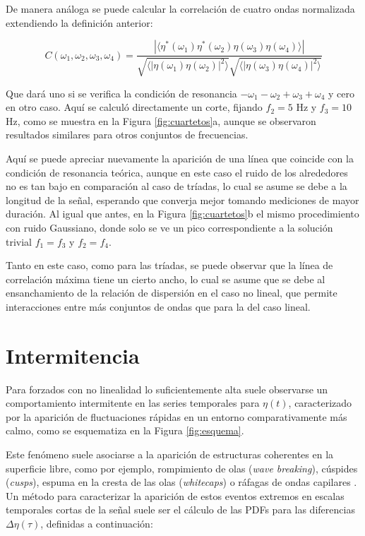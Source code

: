De manera análoga se puede calcular la correlación de cuatro ondas normalizada extendiendo la definición anterior: 

\begin{equation}
	C(\omega_1, \omega_2, \omega_3, \omega_4) = \frac{|\langle\eta^*(\omega_1)\eta^*(\omega_2)\eta(\omega_3)\eta(\omega_4)  \rangle|}{\sqrt{\langle|\eta(\omega_1)\eta(\omega_2)|^2\rangle}\sqrt{\langle|\eta(\omega_3)\eta(\omega_4)|^2\rangle}} %
\end{equation}

Que dará uno si se verifica la condición de resonancia $-\omega_1-\omega_2+\omega_3+\omega_4$ y cero en otro caso. Aquí se calculó directamente un corte, fijando $f_2=5$ Hz y $f_3=10$ Hz, como se muestra en la Figura \ref{fig:cuartetos}a, aunque se observaron resultados similares para otros conjuntos de frecuencias. %



Aquí se puede apreciar nuevamente la aparición de una línea que coincide con la condición de resonancia teórica, aunque en este caso el ruido de los alrededores no es tan bajo en comparación al caso de tríadas, lo cual se asume se debe a la longitud de la señal, esperando que converja mejor tomando mediciones de mayor duración. Al igual que antes, en la Figura \ref{fig:cuartetos}b el mismo procedimiento con ruido Gaussiano, donde solo se ve un pico correspondiente a la solución trivial $f_1=f_3$ y $f_2=f_4$. 

Tanto en este caso, como para las tríadas, se puede observar que la línea de correlación máxima tiene un cierto ancho, lo cual se asume que se debe al ensanchamiento de la relación de dispersión en el caso no lineal, que permite interacciones entre más conjuntos de ondas que para la del caso lineal. 



\section{Intermitencia} 
\label{sec:intermitencia}  %
Para forzados con no linealidad lo suficientemente alta suele observarse un comportamiento intermitente en las series temporales para $\eta(t)$, caracterizado por la aparición de fluctuaciones rápidas en un entorno comparativamente más calmo, como se esquematiza en la Figura \ref{fig:esquema}.  


Este fenómeno suele asociarse a la aparición de estructuras coherentes en la superficie libre, como por ejemplo, rompimiento de olas (\textit{wave breaking}), cúspides (\textit{cusps}), espuma en la cresta de las olas (\textit{whitecaps}) o ráfagas de ondas capilares \cite{falconObservationIntermittencyWave2007, falconOriginIntermittencyWave2010}. Un método para caracterizar la aparición de estos eventos extremos en escalas temporales cortas de la señal suele ser el cálculo de las PDFs para las diferencias $\Delta\eta(\tau)$, definidas a continuación:  

